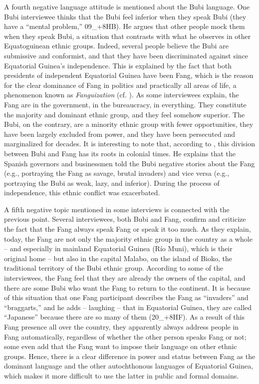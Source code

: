 \documentclass[output=paper]{langscibook}
\begin{document}
A fourth negative language attitude is mentioned about the Bubi language. One Bubi interviewee thinks that the Bubi feel inferior when they speak Bubi (they have a “mental problem,” 09\_+8HB). He argues that other people mock them when they speak Bubi, a situation that contrasts with what he observes in other Equatoguinean ethnic groups. Indeed, several people believe the Bubi are submissive and conformist, and that they have been discriminated against since Equatorial Guinea’s independence. This is explained by the fact that both presidents of independent Equatorial Guinea have been Fang, which is the reason for the clear dominance of Fang in politics and practically all areas of life, a phenomenon known as \textit{Fanguization} (cf. \citealt[62–69]{aixela-cabre_colonists_2013}). As some interviewees explain, the Fang are in the government, in the bureaucracy, in everything. They constitute the majority and dominant ethnic group, and they feel somehow superior. The Bubi, on the contrary, are a minority ethnic group with fewer opportunities, they have been largely excluded from power, and they have been persecuted and marginalized for decades. It is interesting to note that, according to \citet[93]{bolekia_boleka_aproximacion_2003}, this division between Bubi and Fang has its roots in colonial times. He explains that the Spanish governors and businessmen told the Bubi negative stories about the Fang (e.g., portraying the Fang as savage, brutal invaders) and vice versa (e.g., portraying the Bubi as weak, lazy, and inferior). During the process of independence, this ethnic conflict was exacerbated.

A fifth negative topic mentioned in some interviews is connected with the previous point. Several interviewees, both Bubi and Fang, confirm and criticize the fact that the Fang always speak Fang or speak it too much. As they explain, today, the Fang are not only the majority ethnic group in the country as a whole – and especially in mainland Equatorial Guinea (Río Muni), which is their original home – but also in the capital Malabo, on the island of Bioko, the traditional territory of the Bubi ethnic group. According to some of the interviewees, the Fang feel that they are already the owners of the capital, and there are some Bubi who want the Fang to return to the continent. It is because of this situation that one Fang participant describes the Fang as “invaders” and “braggarts,” and he adds – laughing – that in Equatorial Guinea, they are called “Japanese” because there are so many of them (20\_+8HF). As a result of this Fang presence all over the country, they apparently always address people in Fang automatically, regardless of whether the other person speaks Fang or not; some even add that the Fang want to impose their language on other ethnic groups. Hence, there is a clear difference in power and status between Fang as the dominant language and the other autochthonous languages of Equatorial Guinea, which makes it more difficult to use the latter in public and formal domains.
\end{document}
